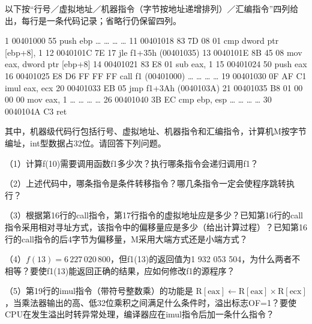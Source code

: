 以下按``行号／虚拟地址／机器指令（字节按地址递增排列）／汇编指令''四列给出，每行是一条代码记录；省略行仍保留四列。

\par\smallskip\noindent\begin{minipage}{\linewidth}
\begin{codeblock}[language={}]
 1  00401000  55              push ebp
 …  …         …               …
11  00401018  83 7D 08 01     cmp dword ptr [ebp+8], 1
12  0040101C  7E 17           jle f1+35h (00401035)
13  0040101E  8B 45 08        mov eax, dword ptr [ebp+8]
14  00401021  83 E8 01        sub eax, 1
15  00401024  50              push eax
16  00401025  E8 D6 FF FF FF  call f1 (00401000)
 …  …         …               …
19  00401030  0F AF C1        imul eax, ecx
20  00401033  EB 05           jmp f1+3Ah (0040103A)
21  00401035  B8 01 00 00 00  mov eax, 1
 …  …         …               …
26  00401040  3B EC           cmp ebp, esp
 …  …         …               …
30  0040104A  C3              ret
\end{codeblock}
\end{minipage}\par\smallskip

其中，机器级代码行包括行号、虚拟地址、机器指令和汇编指令，计算机M按字节编址，int型数据占32位。请回答下列问题。

（1）计算f(10)需要调用函数f1多少次？执行哪条指令会递归调用f1？

（2）上述代码中，哪条指令是条件转移指令？哪几条指令一定会使程序跳转执行？

（3）根据第16行的call指令，第17行指令的虚拟地址应是多少？已知第16行的call指令采用相对寻址方式，该指令中的偏移量应是多少（给出计算过程）？已知第16行的call指令的后4字节为偏移量，M采用大端方式还是小端方式？

（4）\(f(13)=6\,227\,020\,800\)，但f1(13)的返回值为1 932 053 504，为什么两者不相等？要使f1(13)能返回正确的结果，应如何修改f1的源程序？

（5）第19行的imul指令（带符号整数乘）的功能是 \(\mathrm R[\mathrm{eax}]\leftarrow\mathrm R[\mathrm{eax}]\times\mathrm R[\mathrm{ecx}]\)，当乘法器输出的高、低32位乘积之间满足什么条件时，溢出标志OF=1？要使CPU在发生溢出时转异常处理，编译器应在imul指令后加一条什么指令？
